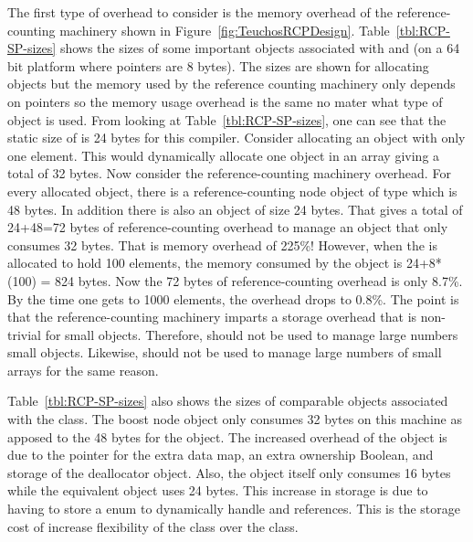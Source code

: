 \documentclass[pdf,ps2pdf,11pt]{SANDreport}
\begin{document}
The first type of overhead to consider is the memory overhead of the
reference-counting machinery shown in
Figure~\ref{fig:TeuchosRCPDesign}.  Table~\ref{tbl:RCP-SP-sizes} shows
the sizes of some important objects associated with {} and
{} (on a 64 bit platform where pointers are 8
bytes).  The sizes are shown for allocating
{} objects but the memory used by the
reference counting machinery only depends on pointers so the memory
usage overhead is the same no mater what type of object is used.  From
looking at Table~\ref{tbl:RCP-SP-sizes}, one can see that the static
size of {} is 24 bytes for this compiler.
Consider allocating an {} object with only
one element.  This would dynamically allocate one {}
object in an array giving a total of 32 bytes.  Now consider the
reference-counting machinery overhead.  For every allocated
{} object, there is a reference-counting node
object of type {} which is
48 bytes.  In addition there is also an {} object of size 24 bytes.  That gives a total of 24+48=72 bytes of
reference-counting overhead to manage an object that only consumes 32
bytes.  That is memory overhead of 225\%!  However, when the
{} is allocated to hold 100 elements, the
memory consumed by the {} object is
24+8*(100) = 824 bytes.  Now the 72 bytes of reference-counting
overhead is only 8.7\%.  By the time one gets to 1000 elements, the
overhead drops to 0.8\%.  The point is that the reference-counting
machinery imparts a storage overhead that is non-trivial for small
objects.  Therefore, {} should not be used to manage large
numbers small objects.  Likewise, {} should not be used
to manage large numbers of small arrays for the same reason.

Table~\ref{tbl:RCP-SP-sizes} also shows the sizes of comparable
objects associated with the {} class.  The
boost {} node object only consumes 32 bytes
on this machine as apposed to the 48 bytes for the {}
object.  The increased overhead of the {} object is
due to the pointer for the extra data map, an extra ownership Boolean,
and storage of the deallocator object.  Also, the
{} object itself only consumes 16 bytes while
the equivalent {} object uses 24 bytes.  This increase in
storage is due to having to store a {} enum to
dynamically handle {} and {} references.  This
is the storage cost of increase flexibility of the {} class
over the {} class.
\end{document}
